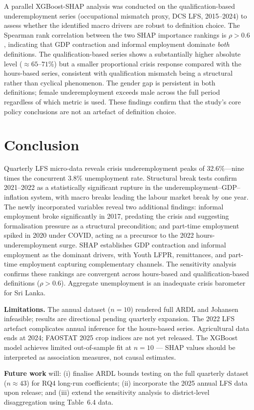 \documentclass[sigconf]{acmart}
\begin{document}
A parallel XGBoost-SHAP analysis was conducted on the
qualification-based underemployment series (occupational mismatch proxy,
DCS LFS, 2015--2024) to assess whether the identified macro drivers are
robust to definition choice. The Spearman rank correlation between the two
SHAP importance rankings is $\rho{>}0.6$, indicating that GDP contraction
and informal employment dominate \emph{both} definitions. The
qualification-based series shows a substantially higher absolute level
(${\approx}65$--$71\%$) but a smaller proportional crisis response compared
with the hours-based series, consistent with qualification mismatch being a
structural rather than cyclical phenomenon. The gender gap is persistent in
both definitions; female underemployment exceeds male across the full period
regardless of which metric is used. These findings confirm that the
study's core policy conclusions are not an artefact of definition choice.

\section{Conclusion}

Quarterly LFS micro-data reveals crisis underemployment peaks of
32.6\%---nine times the concurrent 3.8\% unemployment rate. Structural
break tests confirm 2021--2022 as a statistically significant rupture in the
underemployment--GDP--inflation system, with macro breaks leading the labour
market break by one year. The newly incorporated variables reveal two
additional findings: informal employment broke significantly in 2017,
predating the crisis and suggesting formalisation pressure as a structural
precondition; and part-time employment spiked in 2020 under COVID, acting
as a precursor to the 2022 hours-underemployment surge. SHAP establishes
GDP contraction and informal employment as the dominant drivers, with Youth
LFPR, remittances, and part-time employment capturing complementary channels.
The sensitivity analysis confirms these rankings are convergent across
hours-based and qualification-based definitions ($\rho{>}0.6$). Aggregate
unemployment is an inadequate crisis barometer for Sri Lanka.

\textbf{Limitations.} The annual dataset ($n{=}10$) rendered full ARDL and
Johansen infeasible; results are directional pending quarterly expansion.
The 2022 LFS artefact complicates annual inference for the hours-based
series. Agricultural data ends at 2024; FAOSTAT 2025 crop indices are
not yet released. The XGBoost model achieves limited out-of-sample fit at
$n{=}10$ --- SHAP values should be interpreted as association measures,
not causal estimates.

\textbf{Future work} will: (i) finalise ARDL bounds testing on the full
quarterly dataset ($n{\approx}43$) for RQ4 long-run coefficients;
(ii) incorporate the 2025 annual LFS data upon release; and (iii) extend
the sensitivity analysis to district-level disaggregation using
Table~6.4 data.



\end{document}
